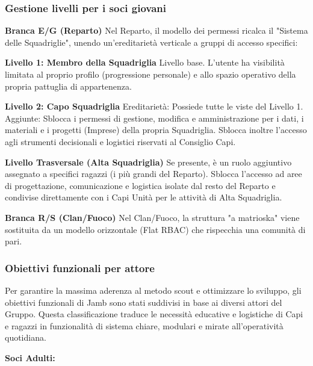 \documentclass[11pt]{article}
\numberwithin{figure}{section}
\begin{document}
\subsubsection{Gestione livelli per i soci giovani}
\textbf{Branca E/G (Reparto)}
Nel Reparto, il modello dei permessi ricalca il "Sistema delle Squadriglie", unendo un'ereditarietà verticale a gruppi di accesso specifici:

\textbf{Livello 1: Membro della Squadriglia} \newline
Livello base. L'utente ha visibilità limitata al proprio profilo (progressione personale) e allo spazio operativo della propria pattuglia di appartenenza.

\textbf{Livello 2: Capo Squadriglia} \newline
Ereditarietà: Possiede tutte le viste del Livello 1.
Aggiunte: Sblocca i permessi di gestione, modifica e amministrazione per i dati, i materiali e i progetti (Imprese) della propria Squadriglia. Sblocca inoltre l'accesso agli strumenti decisionali e logistici riservati al Consiglio Capi.

\textbf{Livello Trasversale (Alta Squadriglia)} \newline
Se presente, è un ruolo aggiuntivo assegnato a specifici ragazzi (i più grandi del Reparto). Sblocca l'accesso ad aree di progettazione, comunicazione e logistica isolate dal resto del Reparto e condivise direttamente con i Capi Unità per le attività di Alta Squadriglia.

\textbf{Branca R/S (Clan/Fuoco)} \newline
Nel Clan/Fuoco, la struttura "a matrioska" viene sostituita da un modello orizzontale (Flat RBAC) che rispecchia una comunità di pari.

\subsubsection{Obiettivi funzionali per attore}
Per garantire la massima aderenza al metodo scout e ottimizzare lo sviluppo, gli obiettivi funzionali di Jamb sono stati suddivisi in base ai diversi attori del Gruppo. Questa classificazione traduce le necessità educative e logistiche di Capi e ragazzi in funzionalità di sistema chiare, modulari e mirate all'operatività quotidiana. 

\textbf{Soci Adulti:} \newline
\end{document}

